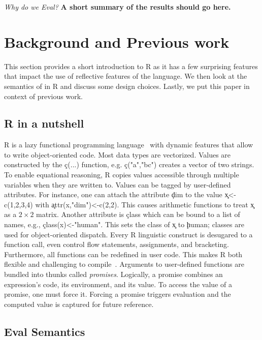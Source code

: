 \documentclass[acmsmall]{acmart}
\begin{document}
\vspace{2mm}\noindent\emph{Why do we Eval?} {\bf A short summary of the
results should go here.}


\section{Background and Previous work}

This section provides a short introduction to R as it has a few
surprising features that impact the use of reflective features of the
language. We then look at the semantics of \eval in R and discuss some
design choices. Lastly, we put this paper in context of previous work.

\subsection{R in a nutshell}

R is a lazy functional programming language~\cite{ecoop12} with
dynamic features that allow to write object-oriented code. Most data
types are vectorized. Values are constructed by the \c{c(...)}
function, e.g. \c{c("a","bc")} creates a vector of two strings. To
enable equational reasoning, R copies values accessible through
multiple variables when they are written to. Values can be tagged by
user-defined attributes. For instance, one can attach the attribute
\c{dim} to the value \c{x<-c(1,2,3,4)} with \c{attr(x,"dim")<-c(2,2)}.
This causes arithmetic functions to treat \c x as a $2 \times 2$
matrix. Another attribute is \c{class} which can be bound to a list of
names, e.g., \c{class(x)<-"human"}. This sets the class of \c{x} to
\c{human}; classes are used for object-oriented dispatch. Every R
linguistic construct is desugared to a function call, even control
flow statements, assignments, and bracketing. Furthermore, all
functions can be redefined in user code. This makes R both flexible
and challenging to compile~\cite{dls19}. Arguments to user-defined
functions are bundled into thunks called \emph{promises}. Logically, a
promise combines an expression's code, its environment, and its value.
To access the value of a promise, one must force it. Forcing a promise
triggers evaluation and the computed value is captured for future
reference.


\subsection{Eval Semantics}
\end{document}
